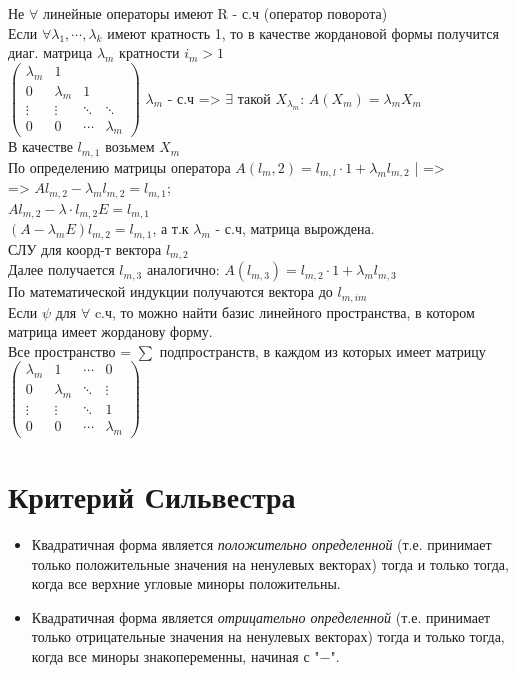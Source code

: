 \documentclass[12pt]{article}
\begin{document}
    Не \(\forall\) линейные операторы имеют R - с.ч (оператор поворота)\\
    Если  \(\forall \lambda_1,\cdots,\lambda_k\) имеют кратность 1, то в качестве жордановой формы получится диаг. матрица \(\lambda_m\) кратности \(i_m > 1\) \\
$
\begin{pmatrix}
    \lambda_m & 1                              \\
    0         & \lambda_m & 1                  \\
    \vdots    & \vdots    & \ddots & \ddots    \\
    0         & 0         & \cdots & \lambda_m
\end{pmatrix}$ $\lambda_m$ - с.ч => $\exists$ такой $X_{\lambda_m}$: $A(X_m) = \lambda_mX_m$\\
    В качестве $l_{m,1}$ возьмем $X_m$\\
    По определению матрицы оператора $A(l_m, 2) = l_{m, l} \cdot 1 + \lambda_ml_{m, 2}$ | =>\\
    => $Al_{m, 2} - \lambda_ml_{m, 2} = l_{m, 1}$;\\
$Al_{m, 2} - \lambda \cdot l_{m, 2}E = l_{m, 1}$\\
$(A - \lambda_mE)l_{m, 2} = l_{m, 1}$, а т.к $\lambda_m$ - с.ч, матрица вырождена. \\
    СЛУ для коорд-т вектора $l_{m, 2}$ \\
    Далее получается $l_{m, 3}$ аналогично: $A(l_{m, 3}) = l_{m, 2} \cdot 1 + \lambda_ml_{m, 3}$\\
    По математической индукции получаются вектора до $l_{m, im}$\\
    Если $\psi$ для $\forall$ c.ч, то можно найти базис линейного пространства, в котором матрица имеет жорданову форму.\\
    Все пространство = $\sum$ подпространств, в каждом из которых имеет матрицу
$
\begin{pmatrix}
    \lambda_m & 1         & \cdots & 0         \\
    0         & \lambda_m & \ddots & \vdots    \\
    \vdots    & \vdots    & \ddots & 1         \\
    0         & 0         & \cdots & \lambda_m
\end{pmatrix}
$

    \section{Критерий Сильвестра}
    \begin{itemize}
        \item Квадратичная форма является
              \textit{положительно определенной} (т.е.
              принимает только положительные значения
              на ненулевых векторах) тогда и только тогда,
              когда все верхние угловые миноры положительны.
        \item Квадратичная форма является
              \textit{отрицательно определенной} (т.е.
              принимает только отрицательные значения
              на ненулевых векторах) тогда и только тогда,
              когда все миноры знакопеременны, начиная с "$-$".
    \end{itemize}
\end{document}
